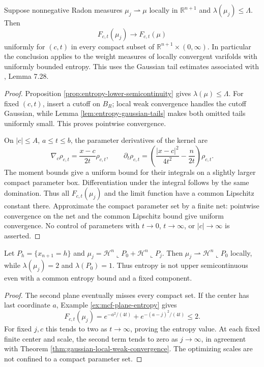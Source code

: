 \begin{theorem}\label{thm:gaussian-local-weak-convergence}
Suppose nonnegative Radon measures $\mu_j\rightharpoonup\mu$ locally in $\mathbb R^{n+1}$ and $\lambda(\mu_j)\leq\Lambda$. Then
\[
 F_{c,t}(\mu_j)\longrightarrow F_{c,t}(\mu)
\]
uniformly for $(c,t)$ in every compact subset of $\mathbb R^{n+1}\times(0,\infty)$. In particular the conclusion applies to the weight measures of locally convergent varifolds with uniformly bounded entropy. This uses the Gaussian tail estimates associated with \cite{CM12}, Lemma 7.28.
\end{theorem}
\begin{proof}
Proposition \ref{prop:entropy-lower-semicontinuity} gives $\lambda(\mu)\leq\Lambda$. For fixed $(c,t)$, insert a cutoff on $B_R$; local weak convergence handles the cutoff Gaussian, while Lemma \ref{lem:entropy-gaussian-tails} makes both omitted tails uniformly small. This proves pointwise convergence.

On $|c|\leq A$, $a\leq t\leq b$, the parameter derivatives of the kernel are
\[
 \nabla_c\rho_{c,t}=\frac{x-c}{2t}\rho_{c,t},\qquad
 \partial_t\rho_{c,t}=\left(\frac{|x-c|^2}{4t^2}-\frac n{2t}\right)\rho_{c,t}.
\]
The moment bounds give a uniform bound for their integrals on a slightly larger compact parameter box. Differentiation under the integral follows by the same domination. Thus all $F_{c,t}(\mu_j)$ and the limit function have a common Lipschitz constant there. Approximate the compact parameter set by a finite net: pointwise convergence on the net and the common Lipschitz bound give uniform convergence. No control of parameters with $t\to0$, $t\to\infty$, or $|c|\to\infty$ is asserted.
\end{proof}

\begin{example}\label{ex:entropy-two-plane-escape}
Let $P_h=\{x_{n+1}=h\}$ and $\mu_j=\mathcal H^n\llcorner P_0+\mathcal H^n\llcorner P_j$. Then $\mu_j\rightharpoonup\mathcal H^n\llcorner P_0$ locally, while $\lambda(\mu_j)=2$ and $\lambda(P_0)=1$. Thus entropy is not upper semicontinuous even with a common entropy bound and a fixed component.
\end{example}
\begin{proof}
The second plane eventually misses every compact set. If the center has last coordinate $a$, Example \ref{ex:mcf-plane-entropy} gives
\[
 F_{c,t}(\mu_j)=e^{-a^2/(4t)}+e^{-(a-j)^2/(4t)}\leq2.
\]
For fixed $j,c$ this tends to two as $t\to\infty$, proving the entropy value. At each fixed finite center and scale, the second term tends to zero as $j\to\infty$, in agreement with Theorem \ref{thm:gaussian-local-weak-convergence}. The optimizing scales are not confined to a compact parameter set.
\end{proof}

